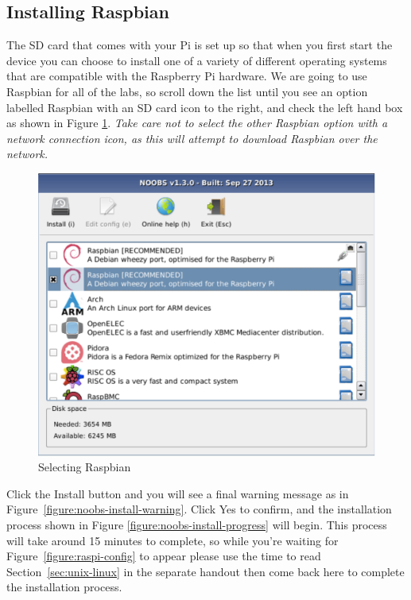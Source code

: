 \subsection{Installing Raspbian}

The SD card that comes with your Pi is set up so that when you first start the device you can choose to install one of a variety of different operating systems that are compatible with the Raspberry Pi hardware. We are going to use Raspbian for all of the labs, so scroll down the list until you see an option labelled Raspbian with an SD card icon to the right, and check the left hand box as shown in Figure \ref{figure:noobs-select-raspbian}. \emph{Take care not to select the other Raspbian option with a network connection icon, as this will attempt to download Raspbian over the network.}

\begin{figure}
\centerline{\includegraphics[width=13cm]{images/noobs-select-raspbian}}
\caption{Selecting Raspbian}\label{figure:noobs-select-raspbian}
\end{figure}

Click the Install button and you will see a final warning message as in Figure~\ref{figure:noobs-install-warning}. Click Yes to confirm, and the installation process shown in Figure \ref{figure:noobs-install-progress} will begin. This process will take around 15 minutes to complete, so while you're waiting for Figure~\ref{figure:raspi-config} to appear please use the time to read Section~\ref{sec:unix-linux} in the separate handout then come back here to complete the installation process.
\label{page:raspbian-install}
  
